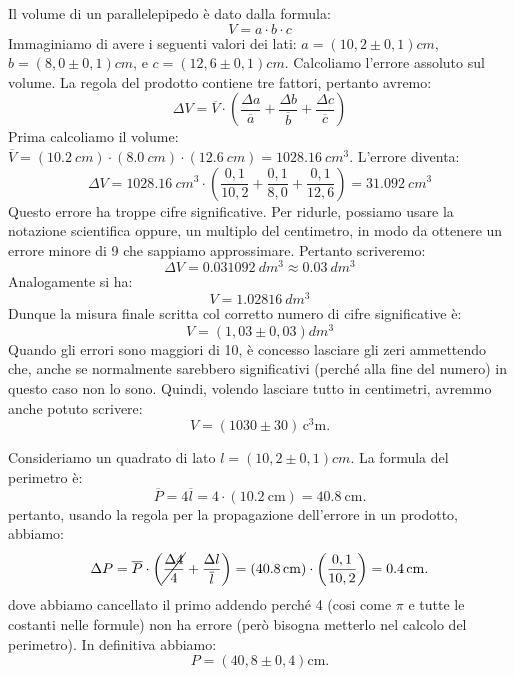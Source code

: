 \begin{testexample}
Il volume di un parallelepipedo è dato dalla formula:
\[
V=a \cdot b \cdot c
\]
Immaginiamo di avere i seguenti valori dei lati: $a=\left(10,2 \pm 0,1\right)\si{cm}$, $b=\left(8,0 \pm 0,1\right)\si{cm}$, e $c=\left(12,6 \pm 0,1\right)\si{cm}$.
Calcoliamo l'errore assoluto sul volume. La regola del prodotto contiene tre fattori, pertanto avremo:
\[
\Delta V=\overline{V} \cdot \left( \frac{\Delta a}{\overline{a}}+\frac{\Delta b}{\overline{b}} +\frac{\Delta c}{\overline{c}}\right)
\]
Prima calcoliamo il volume: $\overline{V}=\left(\SI{10,2}{cm}\right)\cdot \left(\SI{8,0}{cm}\right)\cdot \left(\SI{12,6}{cm}\right)=\SI{1028,16}{cm^3}$.
L'errore diventa:
\[
\Delta V=\SI{1028,16}{cm^3} \cdot \left( \frac{0,1}{10,2}+\frac{0,1}{8,0} +\frac{0,1}{12,6}\right)=\SI{31,092}{cm^3}
\]
Questo errore ha troppe cifre significative. Per ridurle, possiamo usare la notazione scientifica oppure, un multiplo del centimetro, in modo da ottenere un errore minore di 9 che sappiamo approssimare. Pertanto scriveremo:
\[
\Delta V = \SI{0,031092}{dm^3}\approx \SI{0,03}{dm^3}
\]
Analogamente si ha:
\[
V=\SI{1,02816}{dm^3} 
\]
Dunque la misura finale scritta col corretto numero di cifre significative è:
\[
V=\left(1,03 \pm 0,03\right)\si{dm^3}
\]
Quando gli errori sono maggiori di 10, è concesso lasciare gli zeri ammettendo che, anche se normalmente sarebbero significativi (perché alla fine del numero) in questo caso non lo sono. Quindi, volendo lasciare tutto in centimetri, avremmo anche potuto scrivere:
\[
V=\left(1030 \pm 30\right)\,\si{\cubic\centi\meter}.
\]
\end{testexample}
\begin{testexample}
Consideriamo un quadrato di lato  $l=\left(10,2 \pm 0,1\right)\si{cm}$. La formula del perimetro è:
\[
\overline{P}=4\overline{l} = 4\cdot \left(\SI{10,2}{\centi\meter} \right) =\SI{40,8}{\centi\meter}.
\]
pertanto, usando la regola per la propagazione dell'errore in un prodotto, abbiamo:
\[
\Delta P= \overline{P}\cdot\left( \cancel{\frac{\Delta 4}{4}} +\frac{\Delta l}{\overline{l}}  \right) = \left(\SI{40,8}{\centi\meter}\right)\cdot \left(\frac{0,1}{10,2} \right) =\SI{0,4}{\centi\meter} .
\]
dove abbiamo cancellato il primo addendo perché 4 (cosi come $\pi$ e tutte le costanti nelle formule) non ha errore (però bisogna metterlo nel calcolo del perimetro). In definitiva abbiamo:
\[
P=\left(40,8 \pm 0,4\right) \si{\centi\meter}.
\]
\end{testexample}




